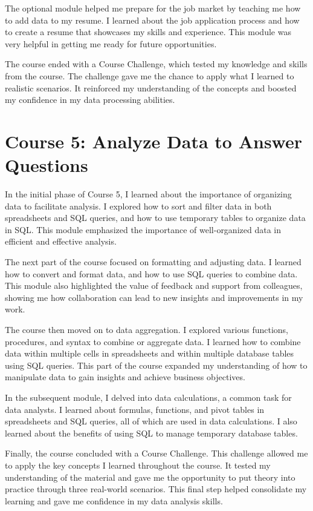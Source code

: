 \documentclass[]{article}
\begin{document}
The optional module helped me prepare for the job market by teaching me how to add data to my resume. I learned about the job application process and how to create a resume that showcases my skills and experience. This module was very helpful in getting me ready for future opportunities.

The course ended with a Course Challenge, which tested my knowledge and skills from the course. The challenge gave me the chance to apply what I learned to realistic scenarios. It reinforced my understanding of the concepts and boosted my confidence in my data processing abilities.
\section{Course 5: Analyze Data to Answer Questions}
In the initial phase of Course 5, I learned about the importance of organizing data to facilitate analysis. I explored how to sort and filter data in both spreadsheets and SQL queries, and how to use temporary tables to organize data in SQL. This module emphasized the importance of well-organized data in efficient and effective analysis.

The next part of the course focused on formatting and adjusting data. I learned how to convert and format data, and how to use SQL queries to combine data. This module also highlighted the value of feedback and support from colleagues, showing me how collaboration can lead to new insights and improvements in my work.

The course then moved on to data aggregation. I explored various functions, procedures, and syntax to combine or aggregate data. I learned how to combine data within multiple cells in spreadsheets and within multiple database tables using SQL queries. This part of the course expanded my understanding of how to manipulate data to gain insights and achieve business objectives.

In the subsequent module, I delved into data calculations, a common task for data analysts. I learned about formulas, functions, and pivot tables in spreadsheets and SQL queries, all of which are used in data calculations. I also learned about the benefits of using SQL to manage temporary database tables.

Finally, the course concluded with a Course Challenge. This challenge allowed me to apply the key concepts I learned throughout the course. It tested my understanding of the material and gave me the opportunity to put theory into practice through three real-world scenarios. This final step helped consolidate my learning and gave me confidence in my data analysis skills.
\end{document}
